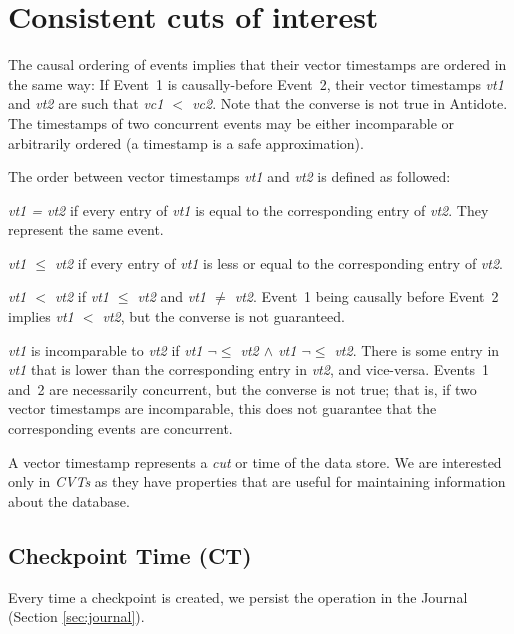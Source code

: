 \documentclass[11pt]{article}
\newcommand{\commentaire}[2][fromWhom?]{{
  \color{magenta}{\bfseries\sffamily\scriptsize$\triangleright$(#1:) #2$\triangleleft$}
}}
\begin{document}
\section{Consistent cuts of interest}
\label{sec:tcc-cuts}
The causal ordering of events implies that their vector timestamps are
ordered in the same way:
If Event~1 is causally-before Event~2, their vector timestamps
\emph{vt1} and \emph{vt2} are such that 
\emph{vc1 $<$ vc2}.
Note that the converse is not true in Antidote.
The timestamps of two
concurrent events may be either incomparable or arbitrarily ordered (a
timestamp is a safe approximation).

The order between vector timestamps \emph{vt1} and \emph{vt2} is defined
as followed:
\begin{compactitem}
\item
  \emph{vt1 = vt2} if every entry of \emph{vt1} is equal to the
  corresponding entry of \emph{vt2}.
  They represent the same event.
\item
  \emph{vt1 $\le$ vt2} if every entry of \emph{vt1} is less or equal to
  the corresponding entry of \emph{vt2}.
\item
  \emph{vt1 $<$ vt2} if \emph{vt1 $\le$ vt2} and \emph{vt1 $\neq$ vt2}.
  Event~1 being causally before Event~2 implies \emph{vt1 $<$ vt2}, but the converse
  is not guaranteed.
\item
  \emph{vt1} is incomparable to \emph{vt2} if \emph{vt1 $\neg\le$ vt2
    $\land$ vt1 $\neg\le$ vt2}.
  There is some entry in \emph{vt1} that is lower than the
  corresponding entry in \emph{vt2}, and vice-versa.
  Events~1 and~2 are necessarily concurrent, but the converse is not true;
  that is, if two vector timestamps are incomparable, this does not guarantee
  that the corresponding events are concurrent.
\end{compactitem}
A vector timestamp represents a \emph{cut} or time of the data store.
We are interested only in \emph{CVTs} as they have properties that are 
useful for maintaining information about the database.


\subsection{Checkpoint Time (CT)}
\label{sec:checkpoint-time}
Every time a checkpoint is created, we persist the operation in the Journal
(Section \ref{sec:journal}).
\end{document}
